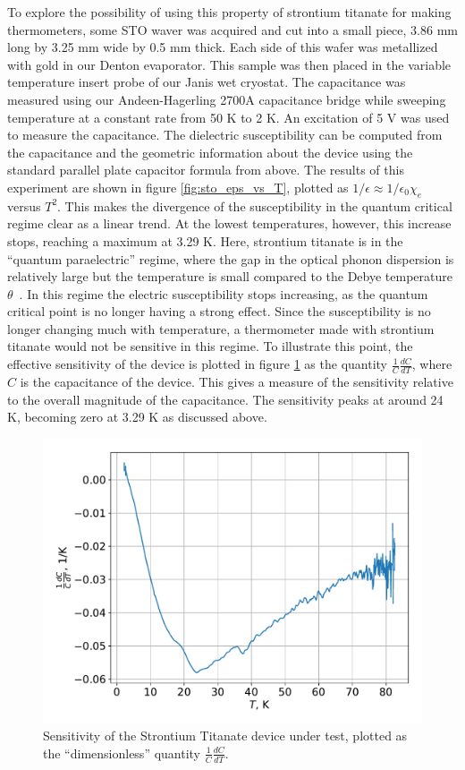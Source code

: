 \documentclass{thesis-umich}
\begin{document}
 To explore the possibility of using this property of strontium titanate for making thermometers, some STO waver was acquired and cut into a small piece, 3.86 mm long by 3.25 mm wide by 0.5 mm thick. Each side of this wafer was metallized with gold in our Denton evaporator. This sample was then placed in the variable temperature insert probe of our Janis wet cryostat. The capacitance was measured using our Andeen-Hagerling 2700A capacitance bridge while sweeping temperature at a constant rate from 50 K to 2 K. An excitation of 5 V was used to measure the capacitance. The dielectric susceptibility can be computed from the capacitance and the geometric information about the device using the standard parallel plate capacitor formula from above. The results of this experiment are shown in figure \ref{fig:sto_eps_vs_T}, plotted as $1/\epsilon \approx 1/\epsilon_0 \chi_e$ versus $T^2$. This makes the divergence of the susceptibility in the quantum critical regime clear as a linear trend. At the lowest temperatures, however, this increase stops, reaching a maximum at 3.29 K. Here, strontium titanate is in the ``quantum paraelectric'' regime, where the gap in the optical phonon dispersion is relatively large but the temperature is small compared to the Debye temperature $\theta$~\cite{RowleyThesis}. In this regime the electric susceptibility stops increasing, as the quantum critical point is no longer having a strong effect. Since the susceptibility is no longer changing much with temperature, a thermometer made with strontium titanate would not be sensitive in this regime. To illustrate this point, the effective sensitivity of the device is plotted in figure \ref{fig:sto_sens_vs_t} as the quantity $\frac{1}{C}\frac{dC}{dT}$, where $C$ is the capacitance of the device. This gives a measure of the sensitivity relative to the overall magnitude of the capacitance. The sensitivity peaks at around 24 K, becoming zero at 3.29 K as discussed above.

\begin{figure}
\caption[Sensitivity of STO test device]{Sensitivity of the Strontium Titanate device under test, plotted as the ``dimensionless'' quantity \(\frac{1}{C} \frac{dC}{dT}\).}
	\label{fig:sto_sens_vs_t}
	\includegraphics[width=\columnwidth]{figures/STO_dCdT_vs_T.pdf}
\end{figure}
\end{document}

